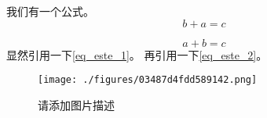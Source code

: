 
我们有一个公式。
\begin{equation}\label{eq_este_2}
b + a = c
\end{equation}

\begin{equation}\label{eq_este_1}
a + b = c
\end{equation}
显然引用一下\autoref{eq_este_1}。 再引用一下\autoref{eq_este_2}。

\begin{figure}[ht]
\centering
\texttt{[image: ./figures/03487d4fdd589142.png]}
\caption{请添加图片描述} \label{fig_este_1}
\end{figure}
